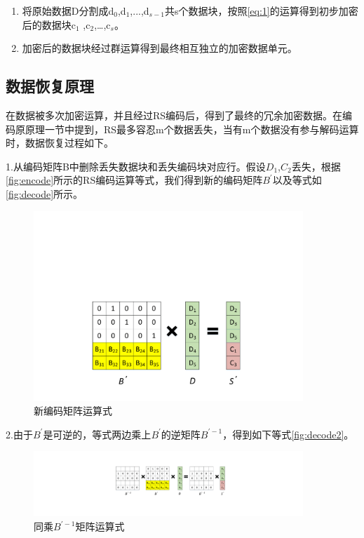 \begin{enumerate}
    \item 将原始数据D分割成d$_{0}$,d$_{1}$,...,d$_{s-1}$共s个数据块，按照\autoref{eq:1}的运算得到初步加密后的数据块c$_{1}$ ,c$_{2}$,…,c$_{s}$。
	\item 加密后的数据块经过群运算得到最终相互独立的加密数据单元。
\end{enumerate}

\subsection{数据恢复原理}
在数据被多次加密运算，并且经过RS编码后，得到了最终的冗余加密数据。在编码原原理一节中提到，RS最多容忍m个数据丢失，当有m个数据没有参与解码运算时，数据恢复过程如下。


1.从编码矩阵B中删除丢失数据块和丢失编码块对应行。假设$D_1$,$C_2$丢失，根据\autoref{fig:encode}所示的RS编码运算等式，我们得到新的编码矩阵$B^{'}$以及等式如\autoref{fig:decode}所示。
\begin{figure}[H]
	\centering
	\includegraphics[width=4in]{Pics/decode.pdf}
	\caption{新编码矩阵运算式}\label{fig:decode}
\end{figure}


2.由于$B^{'}$是可逆的，等式两边乘上$B^{'}$的逆矩阵$B^{'-1}$，得到如下等式\autoref{fig:decode2}。
\begin{figure}[H]
	\centering
	\includegraphics[width=4in]{Pics/decode2.pdf}
	\caption{同乘$B^{'-1}$矩阵运算式}\label{fig:decode2}
\end{figure}


